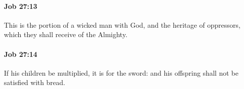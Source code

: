 		\paragraph{Job 27:13} %
			\label{JOB-27-13}

			This is the portion of a wicked man with God, and the heritage of oppressors, which they shall receive of the Almighty.


		\paragraph{Job 27:14} %
			\label{JOB-27-14}

			If his children be multiplied, it is for the sword: and his offspring shall not be satisfied with bread.


